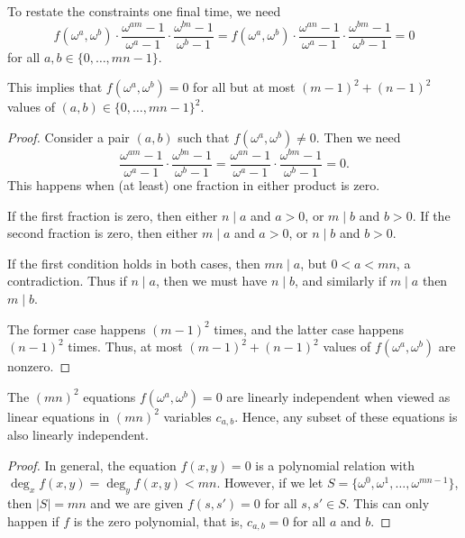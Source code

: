To restate the constraints one final time, we need
\[
  f(\omega^a, \omega^b) \cdot \frac{\omega^{am} - 1}{\omega^a - 1} \cdot \frac{\omega^{bn} - 1}{\omega^b - 1}
  = f(\omega^a, \omega^b) \cdot \frac{\omega^{an} - 1}{\omega^a - 1} \cdot \frac{\omega^{bm} - 1}{\omega^b - 1} = 0
\]
for all $a, b \in \{0, \dots, mn-1\}$.

\begin{claim*}
  This implies that $f(\omega^a, \omega^b) = 0$
  for all but at most $(m-1)^2 + (n-1)^2$ values of $(a,b) \in \{0, \dots, mn-1\}^2$.
\end{claim*}
\begin{proof}
  Consider a pair $(a,b)$ such that $f(\omega^a, \omega^b) \neq 0$.
  Then we need
  \[
    \frac{\omega^{am} - 1}{\omega^a - 1} \cdot \frac{\omega^{bn} - 1}{\omega^b - 1}
    = \frac{\omega^{an} - 1}{\omega^a - 1} \cdot \frac{\omega^{bm} - 1}{\omega^b - 1} = 0.
  \]
  This happens when (at least) one fraction in either product is zero.
  \begin{itemize}
    \ii If the first fraction is zero,
    then either $n \mid a$ and $a > 0$, or $m \mid b$ and $b > 0$.
    \ii If the second fraction is zero,
    then either $m \mid a$ and $a > 0$, or $n \mid b$ and $b > 0$.
  \end{itemize}
  If the first condition holds in both cases, then $mn \mid a$, but $0 < a < mn$,
  a contradiction. Thus if $n \mid a$, then we must have $n \mid b$, and similarly
  if $m \mid a$ then $m \mid b$.

  The former case happens $(m-1)^2$ times, and the latter case happens $(n-1)^2$ times.
  Thus, at most $(m-1)^2 + (n-1)^2$ values of $f(\omega^a, \omega^b)$ are nonzero.
\end{proof}

\begin{claim*}
  The $(mn)^2$ equations $f(\omega^a, \omega^b) = 0$ are linearly independent
  when viewed as linear equations in $(mn)^2$ variables $c_{a,b}$.
  Hence, any subset of these equations is also linearly independent.
\end{claim*}
\begin{proof}
  In general, the equation $f(x,y) = 0$ is a polynomial relation with
  $\deg_x f(x,y) = \deg_y f(x,y) < mn$.
  However, if we let $S = \{\omega^0, \omega^1, \dots, \omega^{mn-1}\}$, then
  $|S| = mn$ and we are given $f(s,s') = 0$ for all $s,s' \in S$.
  This can only happen if $f$ is the zero polynomial,
  that is, $c_{a,b} = 0$ for all $a$ and $b$.
\end{proof}

